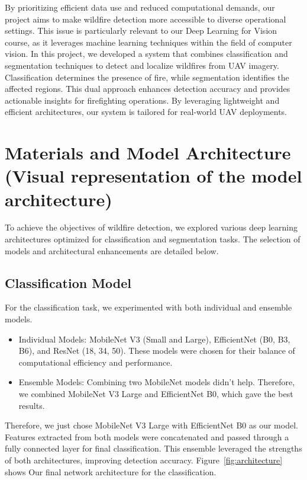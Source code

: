 \documentclass[sigconf, noacm]{acmart}
\begin{document}
By prioritizing efficient data use and reduced computational demands, our project aims to make wildfire detection more accessible to diverse operational settings. This issue is particularly relevant to our Deep Learning for Vision course, as it leverages machine learning techniques within the field of computer vision. In this project, we developed a system that combines classification and segmentation techniques to detect and localize wildfires from UAV imagery. Classification determines the presence of fire, while segmentation identifies the affected regions. This dual approach enhances detection accuracy and provides actionable insights for firefighting operations. By leveraging lightweight and efficient architectures, our system is tailored for real-world UAV deployments.


\section{Materials and Model Architecture (Visual representation of the model architecture)}
To achieve the objectives of wildfire detection, we explored various deep learning architectures optimized for classification and segmentation tasks. The selection of models and architectural enhancements are detailed below.

\subsection{Classification Model}

For the classification task, we experimented with both individual and ensemble models. 
\begin{itemize}
    \item Individual Models: MobileNet V3 (Small and Large), EfficientNet (B0, B3, B6), and ResNet (18, 34, 50). These models were chosen for their balance of computational efficiency and performance.
\end{itemize}
\begin{itemize}
    \item Ensemble Models: Combining two MobileNet models didn’t help. Therefore, we combined MobileNet V3 Large and EfficientNet B0, which gave the best results.
\end{itemize}
Therefore, we just chose MobileNet V3 Large with EfficientNet B0 as our model. Features extracted from both models were concatenated and passed through a fully connected layer for final classification. This ensemble leveraged the strengths of both architectures, improving detection accuracy. Figure~\ref{fig:architecture}  shows Our final network architecture for the classification.
\end{document}
